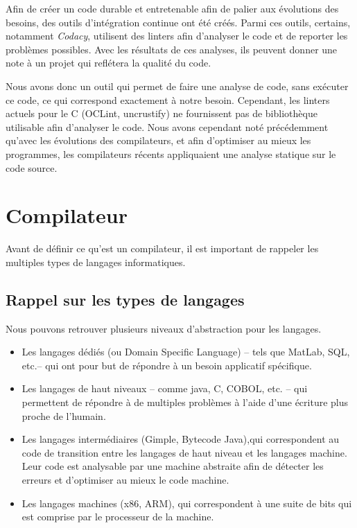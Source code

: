 \documentclass[12pt, twoside, openright]{report}
\begin{document}
Afin de créer un code durable et entretenable afin de palier aux évolutions des besoins, des outils d'intégration continue ont été créés. Parmi ces outils, certains, notamment \textit{Codacy}, utilisent des linters afin d'analyser le code et de reporter les problèmes possibles. Avec les résultats de ces analyses, ils peuvent donner une note à un projet qui reflétera la qualité du code.

Nous avons donc un outil qui permet de faire une analyse de code, sans exécuter ce code, ce qui correspond exactement à notre besoin. Cependant, les linters actuels pour le C (OCLint, uncrustify) ne fournissent pas de bibliothèque utilisable afin d'analyser le code. Nous avons cependant noté précédemment qu'avec les évolutions des compilateurs, et afin d'optimiser au mieux les programmes, les compilateurs récents appliquaient une analyse statique sur le code source.  

\section{Compilateur}

Avant de définir ce qu'est un compilateur, il est important de rappeler les multiples types de langages informatiques.

\subsection{Rappel sur les types de langages}

Nous pouvons retrouver plusieurs niveaux d'abstraction pour les langages.\cite{compilateur01}
\begin{itemize}
    \item Les langages dédiés (ou Domain Specific Language) -- tels que MatLab, SQL, etc.-- qui ont pour but de répondre à un besoin applicatif spécifique. 
    \item Les langages de haut niveaux -- comme java, C, COBOL, etc. -- qui permettent de répondre à de multiples problèmes à l'aide d'une écriture plus proche de l'humain.
    \item Les langages intermédiaires (Gimple, Bytecode Java),qui correspondent au code de transition entre les langages de haut niveau et les langages machine. Leur code est analysable par une machine abstraite afin de détecter les erreurs et d'optimiser au mieux le code machine.
    \item Les langages machines (x86, ARM), qui correspondent à une suite de bits qui est comprise par le processeur de la machine.
\end{itemize}
\end{document}
